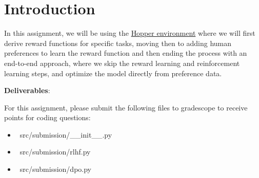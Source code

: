 \section{Introduction}

In this assignment, we will be using the \href{https://gymnasium.farama.org/environments/mujoco/hopper/}{Hopper environment} where we will first derive reward functions for specific tasks, 
moving then to adding human preferences to learn the reward function and then ending the process with an end-to-end approach, where we skip the reward learning and reinforcement learning steps, 
and optimize the model directly from preference data.

\textbf{Deliverables}:

For this assignment, please submit the following files to gradescope to receive points for coding questions:

\begin{itemize}
    \item ~src/submission/__init__.py~
    \item ~src/submission/rlhf.py~
    \item ~src/submission/dpo.py~\\
\end{itemize}